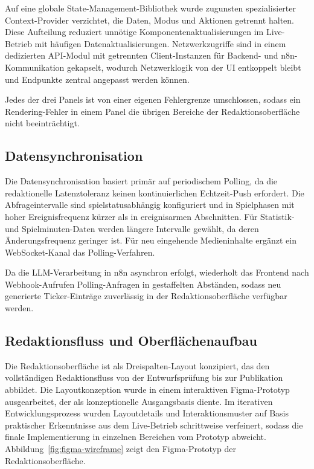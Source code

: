 Auf eine globale State-Management-Bibliothek wurde zugunsten spezialisierter Context-Provider verzichtet, die Daten, Modus und Aktionen getrennt halten. Diese Aufteilung reduziert unnötige Komponentenaktualisierungen im Live-Betrieb mit häufigen Datenaktualisierungen. Netzwerkzugriffe sind in einem dedizierten API-Modul mit getrennten Client-Instanzen für Backend- und n8n-Kommunikation gekapselt, wodurch Netzwerklogik von der UI entkoppelt bleibt und Endpunkte zentral angepasst werden können.

Jedes der drei Panels ist von einer eigenen Fehlergrenze umschlossen, sodass ein Rendering-Fehler in einem Panel die übrigen Bereiche der Redaktionsoberfläche nicht beeinträchtigt.

\subsection{Datensynchronisation}\label{datensynchronisation}

Die Datensynchronisation basiert primär auf periodischem Polling, da die redaktionelle Latenztoleranz keinen kontinuierlichen Echtzeit-Push erfordert. Die Abfrageintervalle sind spielstatusabhängig konfiguriert und in Spielphasen mit hoher Ereignisfrequenz kürzer als in ereignisarmen Abschnitten. Für Statistik- und Spielminuten-Daten werden längere Intervalle gewählt, da deren Änderungsfrequenz geringer ist. Für neu eingehende Medieninhalte ergänzt ein WebSocket-Kanal das Polling-Verfahren.

Da die LLM-Verarbeitung in n8n asynchron erfolgt, wiederholt das Frontend nach Webhook-Aufrufen Polling-Anfragen in gestaffelten Abständen, sodass neu generierte Ticker-Einträge zuverlässig in der Redaktionsoberfläche verfügbar werden.

\subsection{Redaktionsfluss und Oberflächenaufbau}\label{dreispalten-layout-und-redaktionsfluss}

Die Redaktionsoberfläche ist als Dreispalten-Layout konzipiert, das den vollständigen Redaktionsfluss von der Entwurfsprüfung bis zur Publikation abbildet. Die Layoutkonzeption wurde in einem interaktiven Figma-Prototyp ausgearbeitet, der als konzeptionelle Ausgangsbasis diente. Im iterativen Entwicklungsprozess wurden Layoutdetails und Interaktionsmuster auf Basis praktischer Erkenntnisse aus dem Live-Betrieb schrittweise verfeinert, sodass die finale Implementierung in einzelnen Bereichen vom Prototyp abweicht. Abbildung~\ref{fig:figma-wireframe} zeigt den Figma-Prototyp der Redaktionsoberfläche.

